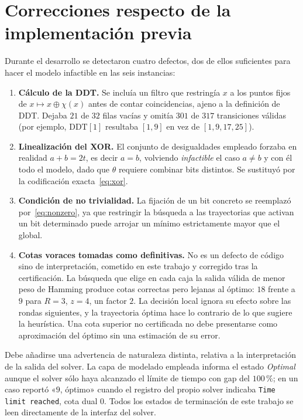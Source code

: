 \documentclass[conference]{IEEEtran}
\newcommand{\xor}{\oplus}
\begin{document}
\section{Correcciones respecto de la implementación previa}

Durante el desarrollo se detectaron cuatro defectos, dos de ellos suficientes para hacer el
modelo infactible en las seis instancias:

\begin{enumerate}
\item \textbf{Cálculo de la DDT.} Se incluía un filtro que restringía $x$ a los puntos
fijos de $x\mapsto x\xor\chi(x)$ antes de contar coincidencias, ajeno a la definición de
DDT. Dejaba $21$ de $32$ filas vacías y omitía $301$ de $317$ transiciones válidas (por
ejemplo, $\mathrm{DDT}[1]$ resultaba $[1,9]$ en vez de $[1,9,17,25]$).
\item \textbf{Linealización del XOR.} El conjunto de desigualdades empleado forzaba en
realidad $a+b=2t$, es decir $a=b$, volviendo \emph{infactible} el caso $a\neq b$ y con
él todo el modelo, dado que $\theta$ requiere combinar bits distintos. Se sustituyó por
la codificación exacta~\eqref{eq:xor}.
\item \textbf{Condición de no trivialidad.} La fijación de un bit concreto se reemplazó
por~\eqref{eq:nonzero}, ya que restringir la búsqueda a las trayectorias que activan un bit
determinado puede arrojar un mínimo estrictamente mayor que el global.
\item \textbf{Cotas voraces tomadas como definitivas.} No es un defecto de código sino de
interpretación, cometido en este trabajo y corregido tras la certificación. La búsqueda que
elige en cada caja la salida válida de menor peso de Hamming produce cotas correctas pero
lejanas al óptimo: $18$ frente a $9$ para $R=3$, $z=4$, un factor $2$. La decisión local
ignora su efecto sobre las rondas siguientes, y la trayectoria óptima hace lo contrario de
lo que sugiere la heurística. Una cota superior no certificada no debe presentarse como
aproximación del óptimo sin una estimación de su error.
\end{enumerate}

Debe añadirse una advertencia de naturaleza distinta, relativa a la interpretación de la
salida del solver. La capa de modelado empleada informa el estado \emph{Optimal} aunque el
solver sólo haya alcanzado el límite de tiempo con gap del $100\,\%$; en un caso reportó
«$9$, óptimo» cuando el registro del propio solver indicaba \texttt{Time limit reached},
cota dual $0$. Todos los estados de terminación de este trabajo se leen directamente de la
interfaz del solver.
\end{document}
